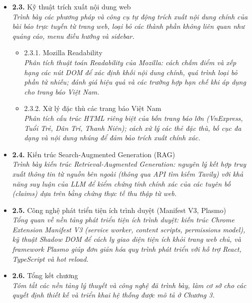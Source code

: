 \documentclass[a4paper,12pt]{article}
\begin{document}
\begin{itemize}[leftmargin=1cm, labelsep=0.3cm, itemsep=1pt, label={}]
  \item \textbf{2.3.} Kỹ thuật trích xuất nội dung web \\
  {\small\itshape Trình bày các phương pháp và công cụ tự động trích xuất nội dung chính của bài báo trực tuyến từ trang web, loại bỏ các thành phần không liên quan như quảng cáo, menu điều hướng và sidebar.}
  \begin{itemize}[leftmargin=1cm, itemsep=0pt, label={}]
    \item 2.3.1. Mozilla Readability \\
      {\small\itshape Phân tích thuật toán Readability của Mozilla: cách chấm điểm và xếp hạng các nút DOM để xác định khối nội dung chính, quá trình loại bỏ phần tử nhiễu; đánh giá hiệu quả và các trường hợp hạn chế khi áp dụng cho trang báo Việt Nam.}
    \item 2.3.2. Xử lý đặc thù các trang báo Việt Nam \\
      {\small\itshape Phân tích cấu trúc HTML riêng biệt của bốn trang báo lớn (VnExpress, Tuổi Trẻ, Dân Trí, Thanh Niên); cách xử lý các thẻ đặc thù, bố cục đa dạng và nội dung nhúng để đảm bảo trích xuất chính xác.}
  \end{itemize}

  \item \textbf{2.4.} Kiến trúc Search-Augmented Generation (RAG) \\
  {\small\itshape Trình bày kiến trúc Retrieval-Augmented Generation: nguyên lý kết hợp truy xuất thông tin từ nguồn bên ngoài (thông qua API tìm kiếm Tavily) với khả năng suy luận của LLM để kiểm chứng tính chính xác của các tuyên bố (claims) dựa trên bằng chứng thực tế thu thập từ web.}

  \item \textbf{2.5.} Công nghệ phát triển tiện ích trình duyệt (Manifest V3, Plasmo) \\
  {\small\itshape Tổng quan về nền tảng phát triển tiện ích trình duyệt: kiến trúc Chrome Extension Manifest V3 (service worker, content scripts, permissions model), kỹ thuật Shadow DOM để cách ly giao diện tiện ích khỏi trang web chủ, và framework Plasmo giúp đơn giản hóa quy trình phát triển với hỗ trợ React, TypeScript và hot reload.}

  \item \textbf{2.6.} Tổng kết chương \\
  {\small\itshape Tóm tắt các nền tảng lý thuyết và công nghệ đã trình bày, làm cơ sở cho các quyết định thiết kế và triển khai hệ thống được mô tả ở Chương 3.}
\end{itemize}
\end{document}
